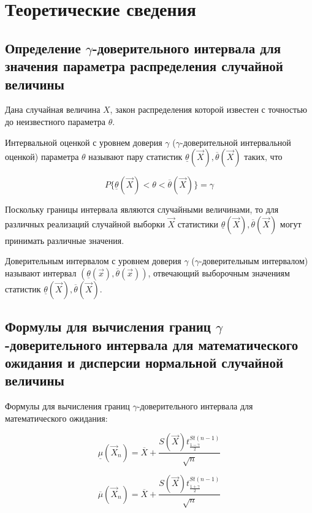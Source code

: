 \documentclass[12pt]{report}
\begin{document}
\chapter*{Теоретические сведения}

\section*{Определение $\gamma$-доверительного интервала для значения параметра распределения случайной величины}

Дана случайная величина $X$, закон распределения которой известен с точностью до неизвестного параметра $\theta$.

Интервальной оценкой с уровнем доверия $\gamma$ ($\gamma$-доверительной интервальной оценкой) параметра $\theta$ называют пару статистик $\underline{\theta}(\vec X), \overline{\theta}(\vec X)$ таких, что

\begin{equation*}
	P\{\underline{\theta}(\vec X)<\theta<\overline{\theta}(\vec X)\}=\gamma
\end{equation*}

Поскольку границы интервала являются случайными величинами, то для различных реализаций случайной выборки $\vec X$ статистики $\underline{\theta}(\vec X), \overline{\theta}(\vec X)$ могут принимать различные значения.

Доверительным интервалом с уровнем доверия $\gamma$ ($\gamma$-доверительным интервалом) называют интервал $(\underline{\theta}(\vec x), \overline{\theta}(\vec x))$, отвечающий выборочным значениям статистик $\underline{\theta}(\vec X), \overline{\theta}(\vec X)$.

\section*{Формулы для вычисления границ $\gamma$-доверительного интервала для математического ожидания и дисперсии нормальной случайной величины}

Формулы для вычисления границ $\gamma$-доверительного интервала для математического ожидания:

\begin{equation}
	\underline\mu(\vec X_n)=\overline X + \frac{S(\vec X)t^{St(n-1)}_{\frac{1-\gamma}{2}}}{\sqrt{n}}
\end{equation}

\begin{equation}
	\overline\mu(\vec X_n)=\overline X + \frac{S(\vec X)t^{St(n-1)}_{\frac{1+\gamma}{2}}}{\sqrt{n}}
\end{equation}
\end{document}
